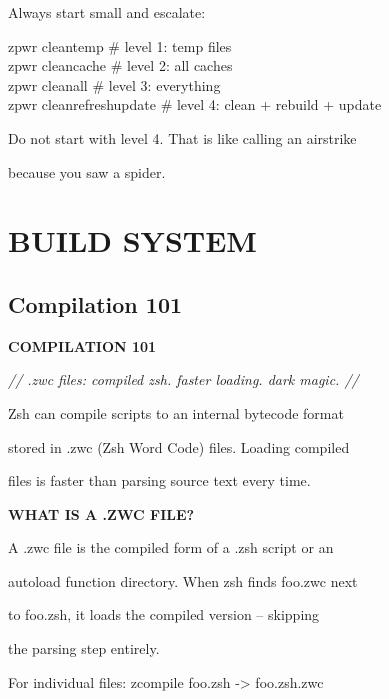 \documentclass[11pt,a4paper,twoside]{book}
\begin{document}
Always start small and escalate:

\begin{codebox}
zpwr cleantemp                      \# level 1: temp files\\
zpwr cleancache                     \# level 2: all caches\\
zpwr cleanall                       \# level 3: everything\\
zpwr cleanrefreshupdate             \# level 4: clean + rebuild + update\\
\end{codebox}

Do not start with level 4. That is like calling an airstrike

because you saw a spider.


\vspace{16pt}


\chapter{BUILD SYSTEM}

\section{Compilation 101}


\vspace{10pt}
{\large\bfseries\color{neoncyan} COMPILATION 101}\vspace{6pt}

{\small\itshape\color{dimtext} // .zwc files: compiled zsh. faster loading. dark magic. //}

Zsh can compile scripts to an internal bytecode format

stored in .zwc (Zsh Word Code) files. Loading compiled

files is faster than parsing source text every time.


\vspace{12pt}
{\bfseries\color{neonyellow} WHAT IS A .ZWC FILE?}\vspace{4pt}

A .zwc file is the compiled form of a .zsh script or an

autoload function directory. When zsh finds foo.zwc next

to foo.zsh, it loads the compiled version -- skipping

the parsing step entirely.

For individual files: zcompile foo.zsh -> foo.zsh.zwc
\end{document}
